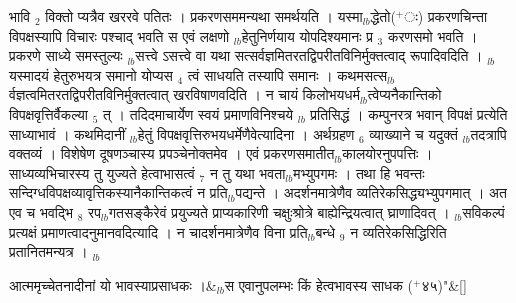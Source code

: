 \documentclass[article,12pt,a4paper]{memoir}%
\newcommand{\add}[1]{($^{+}$#1)}
\begin{document}
	  
	  \pstart \leavevmode%
	\hphantom{.}{\color{DodgerBlue3}भावि {\tiny $_{2}$} विक्तो} प्यत्रैव खररवे पतितः । प्रकरणसममन्यथा समर्थयति । यस्मा{\tiny $_{lb}$}द्धेतो\add{ः} प्रकरणचिन्ता विपक्षस्यापि विचारः पश्चाद् भवति स एवं लक्षणो {\tiny $_{lb}$}हेतुनिर्णयाय योपदिश्यमानः प्र {\tiny $_{3}$} करणसमो भवति । प्रकरणे साध्ये समस्तुल्यः {\tiny $_{lb}$}सत्त्वे ऽसत्त्वे वा यथा सत्सर्वज्ञमितरतद्विपरीतविनिर्मुक्तत्वाद् रूपादिवदिति । {\tiny $_{lb}$}यस्मादयं हेतुरुभयत्र समानो योप्यस {\tiny $_{4}$} त्वं साधयति तस्यापि समानः । कथमसत्स{\tiny $_{lb}$}र्वज्ञत्वमितरतद्विपरीतविनिर्मुक्तत्वात् खरविषाणवदिति । न चायं किलोभयधर्म{\tiny $_{lb}$}त्वेप्यनैकान्तिको विपक्षवृत्तिर्वैकल्या {\tiny $_{5}$} त् । तदिदमाचार्येण स्वयं {\color{DodgerBlue3}प्रमाणविनिश्चये}  {\tiny $_{lb}$} प्रतिसिद्धं । कम्पुनरत्र भवान् विपक्षं प्रत्येति साध्याभावं । कथमिदानीं {\tiny $_{lb}$}हेतुं विपक्षवृत्तिरुभयधर्मेणैवेत्यादिना । अर्थग्रहण {\tiny $_{6}$} व्याख्याने च यदुक्तं {\tiny $_{lb}$}तदत्रापि वक्तव्यं । विशेषेण दूषणञ्चास्य प्रपञ्चेनोक्तमेव । एवं प्रकरणसमातीत{\tiny $_{lb}$}कालयोरनुपपत्तिः । साध्यव्यभिचारस्य तु युज्यते हेत्वाभासत्वं {\tiny $_{7}$} न तु यथा भवता{\tiny $_{lb}$}मभ्युपगमः । तथा हि भवन्तः सन्दिग्धविपक्षव्यावृत्तिकस्यानैकान्तिकत्वं न प्रति{\tiny $_{lb}$}पद्यन्ते । अदर्शनमात्रेणैव व्यतिरेकसिद्ध्यभ्युपगमात् । अत एव च भवद्भि {\tiny $_{8}$} रप{\tiny $_{lb}$}गतसङ्कैरेवं प्रयुज्यते प्राप्यकारिणी चक्षुःश्रोत्रे बाह्येन्द्रियत्वात् घ्राणादिवत् । {\tiny $_{lb}$}सविकल्पं प्रत्यक्षं प्रमाणत्वादनुमानवदित्यादि । न चादर्शनमात्रेणैव विना प्रति{\tiny $_{lb}$}बन्धे {\tiny $_{9}$} \leavevmode{} न व्यतिरेकसिद्धिरिति प्रतानितमन्यत्र । {\tiny $_{lb}$} 
	    \pend%
	  
	    
	    \stanza[\smallbreak]
	  आत्ममृच्चेतनादीनां यो भावस्याप्रसाधकः ।&{\tiny $_{lb}$}स एवानुपलम्भः किं हेत्वभावस्य साधक \add{४५}{\normalfontlatin\large\qquad{}"}\&[\smallbreak]
	  
	  
	  
\end{document}
